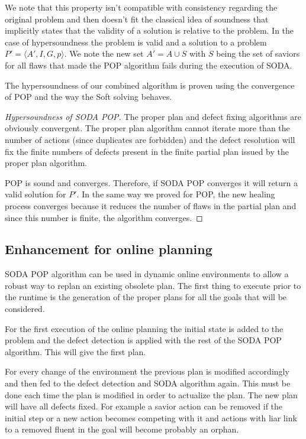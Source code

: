 \documentclass[]{article}
\begin{document}
We note that this property isn't compatible with consistency regarding
the original problem and then doesn't fit the classical idea of
soundness that implicitly states that the validity of a solution is
relative to the problem. In the case of hypersoundness the problem is
valid and a solution to a problem \(P' = \langle A', I, G, p\rangle\).
We note the new set \(A' = A \cup S\) with \(S\) being the set of
saviors for all flaws that made the POP algorithm fails during the
execution of SODA.

The hypersoundness of our combined algorithm is proven using the
convergence of POP and the way the Soft solving behaves.

\begin{proof}[Hypersoundness of SODA POP]

The proper plan and defect fixing algorithms are obviously convergent.
The proper plan algorithm cannot iterate more than the number of actions
(since duplicates are forbidden) and the defect resolution will fix the
finite numbers of defects present in the finite partial plan issued by
the proper plan algorithm.

POP is sound and converges. Therefore, if SODA POP converges it will
return a valid solution for \(P'\). In the same way we proved for POP,
the new healing process converges because it reduces the number of flaws
in the partial plan and since this number is finite, the algorithm
converges.\qedhere

\end{proof}

\subsection{Enhancement for online
planning}\label{enhancement-for-online-planning}

SODA POP algorithm can be used in dynamic online environments to allow a
robust way to replan an existing obsolete plan. The first thing to
execute prior to the runtime is the generation of the proper plans for
all the goals that will be considered.

For the first execution of the online planning the initial state is
added to the problem and the defect detection is applied with the rest
of the SODA POP algorithm. This will give the first plan.

For every change of the environment the previous plan is modified
accordingly and then fed to the defect detection and SODA algorithm
again. This must be done each time the plan is modified in order to
actualize the plan. The new plan will have all defects fixed. For
example a savior action can be removed if the initial step or a new
action becomes competing with it and actions with liar link to a removed
fluent in the goal will become probably an orphan.
\end{document}
